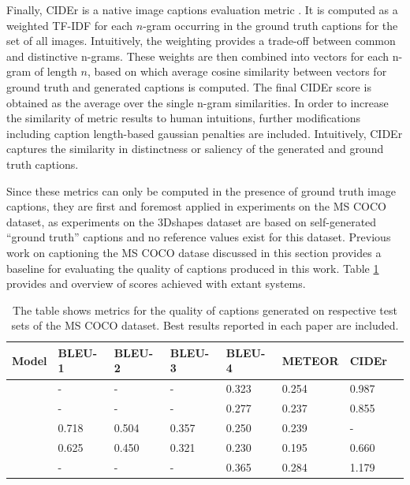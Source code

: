 Finally, CIDEr is a native image captions evaluation metric \parencite{vedantam2015cider}. It is computed as a weighted TF-IDF for each $n$-gram occurring in the ground truth captions for the set of all images. Intuitively, the weighting provides a trade-off between common and distinctive n-grams. These weights are then combined into vectors for each n-gram of length $n$, based on which average cosine similarity between vectors for ground truth and generated captions is computed. The final CIDEr score is obtained as the average over the single n-gram similarities. In order to increase the similarity of metric results to human intuitions, further modifications including caption length-based gaussian penalties are included. Intuitively, CIDEr captures the similarity in distinctness or saliency of the generated and ground truth captions.


Since these metrics can only be computed in the presence of ground truth image captions, they are first and foremost applied in experiments on the MS COCO dataset, as experiments on the 3Dshapes dataset are based on self-generated ``ground truth'' captions and no reference values exist for this dataset.
Previous work on captioning the MS COCO datase discussed in this section provides a baseline for evaluating the quality of captions produced in this work. Table \ref{tab_coco_metrics_ref} provides and overview of scores achieved with extant systems.

\begin{table}[]
	\begin{tabular}{|l|l|l|l|l|l|l|l|}
		\hline
		Model                               & BLEU-1 & BLEU-2 & BLEU-3 & BLEU-4 & METEOR & CIDEr \\ \hline
		\cite{bengio2015scheduled}        & -      & -      & -      & 0.323   & 0.254  & 0.987 \\ \hline
		\cite{vinyals2015show}  & -      & -      & -      & 0.277    & 0.237  & 0.855 \\ \hline
		\cite{xu2015show} & 0.718  & 0.504  & 0.357  & 0.250     & 0.239  & -     \\ \hline
		\cite{karpathy2015deep}          & 0.625  & 0.450  & 0.321  & 0.230   & 0.195  & 0.660 \\ \hline
		\cite{zhou2019unified}          & -  & -  & -  & 0.365   & 0.284  & 1.179 \pt{?} \\ \hline
	\end{tabular}
\caption{\label{tab_coco_metrics_ref}The table shows metrics for the quality of captions generated on respective test sets of the MS COCO dataset. Best results reported in each paper are included.}
\end{table}

